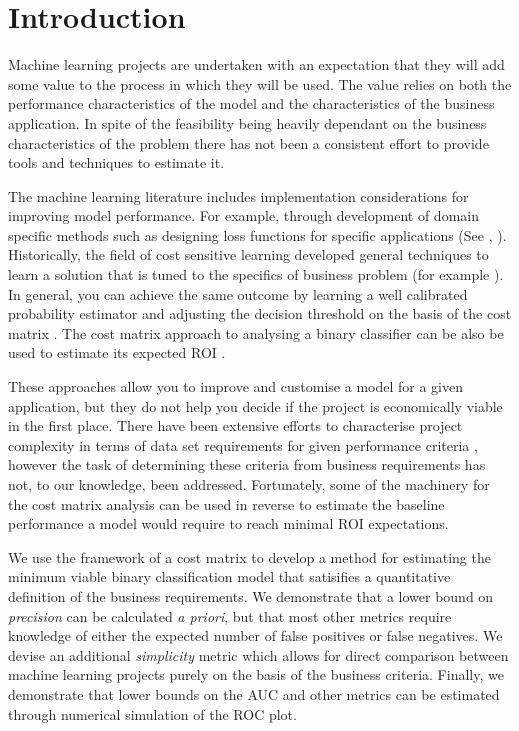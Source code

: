 \documentclass[preprint,12pt, a4paper]{elsarticle}
\begin{document}
\noindent

\section{Introduction}

Machine learning projects are undertaken with an expectation
that they will add some value to the process in which they will be used.
The value relies on both the performance characteristics of the model
and the characteristics of the business application. In spite of the
feasibility being heavily dependant on the business characteristics of
the problem there has not been a consistent effort to provide tools and
techniques to estimate it.

The machine learning literature includes implementation considerations
for improving model performance. For example, through development of domain 
specific methods such as designing loss functions for specific applications 
(See \cite{Johnson19}, \cite{Hennig2007}). Historically, the field of  
cost sensitive learning \cite{Domingos1999,Margineantu2000,Elkan2001,Tian+Zhang2019}
developed general techniques to learn a solution that is tuned to the
specifics of business problem (for example \cite{Fatlawi2017}). 
In general, you can achieve the same outcome by learning a well calibrated 
probability estimator and adjusting the decision threshold
on the basis of the cost matrix \cite{Nikolaou2016}.
The cost matrix approach to analysing a binary classifier can be also be used to estimate its expected ROI \cite{Ylijoki2018}.

These approaches allow you to improve and customise a model for a given application, 
but they do not help you decide if the project is economically viable in the first place. 
There have been extensive efforts to characterise project
complexity in terms of data set requirements for given performance 
criteria \cite{Raudys1991}, however the task of determining these criteria 
from business requirements has not, to our knowledge, been addressed.
Fortunately, some of the machinery for the cost matrix
analysis can be used in reverse to estimate the baseline performance 
a model would require to reach minimal ROI expectations.

We use the framework of a cost matrix to develop a method for estimating 
the minimum viable binary classification
model that satisifies a quantitative definition of the business requirements. 
We demonstrate that a lower bound
on \textit{precision} can be calculated \textit{a priori}, 
but that most other metrics require knowledge of either the expected number
of false positives or false negatives. We devise an additional 
\textit{simplicity} metric which allows for direct
comparison between machine learning projects purely on the basis of the business criteria. Finally, we demonstrate
that lower bounds on the AUC and other metrics can be estimated through numerical simulation of the ROC plot.
\end{document}
